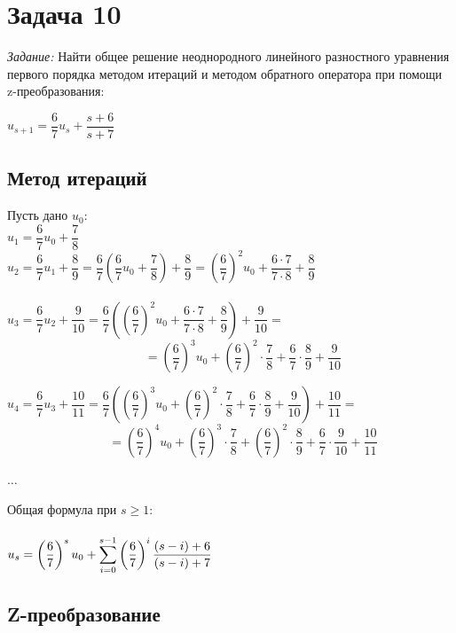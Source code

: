 \documentclass[14pt,fleqn]{extarticle}
\begin{document}
	\newpage
	
	\section*{Задача 10}
	\textit{Задание:} Найти  общее решение неоднородного линейного разностного уравнения первого порядка методом итераций и методом обратного оператора при помощи z-преобразования:
	\begin{center}
		$u_{s+1} = \dfrac{6}{7}u_s + \dfrac{s+6}{s+7}$
	\end{center}
	\subsection*{Метод итераций}
	Пусть дано $u_0$:\\
	
	$u_1 = \dfrac{6}{7}u_0 + \dfrac{7}{8}$\\
	
	$u_2 = \dfrac{6}{7}u_1 + \dfrac{8}{9} = \dfrac{6}{7}\left(\dfrac{6}{7}u_0 + \dfrac{7}{8}\right) + \dfrac{8}{9} = \left(\dfrac{6}{7}\right)^2u_0 + \dfrac{6 \cdot 7}{7 \cdot 8} + \dfrac{8}{9}$\\\\
	
	$u_3 = \dfrac{6}{7}u_2 + \dfrac{9}{10} = \dfrac{6}{7}\left(\left(\dfrac{6}{7}\right)^2u_0 + \dfrac{6 \cdot 7}{7 \cdot 8} + \dfrac{8}{9}\right) + \dfrac{9}{10} =$\\
	\[
		\qquad = \left(\dfrac{6}{7}\right)^3u_0 + \left(\dfrac{6}{7}\right)^2\cdot\dfrac{7}{8} + \dfrac{6}{7}\cdot\dfrac{8}{9} + \dfrac{9}{10}
	\]
	\newline
	
	$u_4 = \dfrac{6}{7}u_3 + \dfrac{10}{11} = \dfrac{6}{7}\left(\left(\dfrac{6}{7}\right)^3u_0 + \left(\dfrac{6}{7}\right)^2\cdot\dfrac{7}{8} + \dfrac{6}{7}\cdot\dfrac{8}{9} + \dfrac{9}{10}\right) + \dfrac{10}{11} =$\\
	\[
		\qquad = \left(\dfrac{6}{7}\right)^4u_0 + \left(\dfrac{6}{7}\right)^3\cdot\dfrac{7}{8} + \left(\dfrac{6}{7}\right)^2\cdot\dfrac{8}{9} + \dfrac{6}{7}\cdot\dfrac{9}{10} + \dfrac{10}{11}
	\]
	
	\begin{center}
		$\ldots$
	\end{center}
	Общая формула при $s \geq 1$:\\\\
	$u_s = \left(\dfrac{6}{7}\right)^su_0 + \smashoperator[r]{\sum_{i=0}^{s-1}} \left(\dfrac{6}{7}\right)^i \dfrac{(s-i) + 6}{(s-i) + 7}$
	\newpage
	\subsection*{Z-преобразование}
\end{document}
